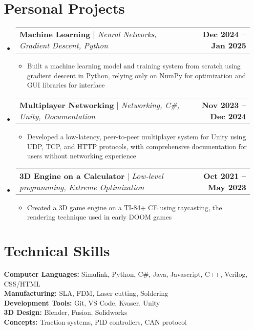 \documentclass[letterpaper,11pt]{article}
\makeatletter
\newcommand{\resumeItem}[1]{
  \item\small{
    {#1 \vspace{-2pt}}
  }
}
\newcommand{\resumeProjectHeading}[2]{
    \item
    \begin{tabular*}{1.001\textwidth}{l@{\extracolsep{\fill}}r}
      \small#1 & \textbf{\small #2}\\
    \end{tabular*}\vspace{-7pt}
}
\newcommand{\resumeSubHeadingListStart}{\begin{itemize}[leftmargin=0.0in, label={}]}
\newcommand{\resumeSubHeadingListEnd}{\end{itemize}}
\newcommand{\resumeItemListStart}{\begin{itemize}}
\newcommand{\resumeItemListEnd}{\end{itemize}\vspace{-5pt}}
\makeatother
\begin{document}
\section{Personal Projects}
    \vspace{-5pt}
    \resumeSubHeadingListStart
      \resumeProjectHeading
          {\textbf{Machine Learning} $|$ \emph{Neural Networks, Gradient Descent, Python}}{Dec 2024 -- Jan 2025}
          \resumeItemListStart 
            \resumeItem{Built a machine learning model and training system from scratch using gradient descent in Python, relying only on NumPy for optimization and GUI libraries for interface}
          \resumeItemListEnd
          \vspace{-16pt}
      \resumeProjectHeading
          {\textbf{Multiplayer Networking} $|$ \emph{Networking, C\#, Unity, Documentation}}{Nov 2023 -- Dec 2024}
          \resumeItemListStart
            \resumeItem{Developed a low-latency, peer-to-peer multiplayer system for Unity using UDP, TCP, and HTTP protocols, with comprehensive documentation for users without networking experience}
          \resumeItemListEnd
          \vspace{-16pt}
      \resumeProjectHeading
          {\textbf{3D Engine on a Calculator} $|$ \emph{Low-level programming, Extreme Optimization}}{Oct 2021 -- May 2023}
          \resumeItemListStart
            \resumeItem{Created a 3D game engine on a TI-84+ CE using raycasting, the rendering technique used in early DOOM games}
          \resumeItemListEnd
          \vspace{-16pt}
    \resumeSubHeadingListEnd
\vspace{5pt} 


\section{Technical Skills}
 \begin{itemize}[leftmargin=0.15in, label={}]
    \small{\item{
     \textbf{Computer Languages:}{ Simulink, Python, C\#, Java, Javascript, C++, Verilog, CSS/HTML} \\
     \textbf{Manufacturing:}{ SLA, FDM, Laser cutting, Soldering} \\
     \textbf{Development Tools:}{ Git, VS Code, Kvaser, Unity} \\
     \textbf{3D Design:}{ Blender, Fusion, Solidworks} \\
     \textbf{Concepts:}{ Traction systems, PID controllers, CAN protocol} }}
 \end{itemize}
 \vspace{-16pt} 
\end{document}
